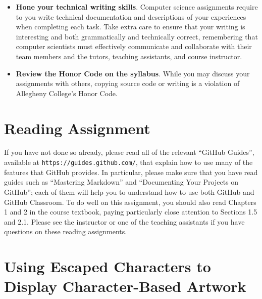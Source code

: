 \documentclass[11pt]{article}
\newcommand{\url}[1]{\lstinline{#1}}
\begin{document}
\begin{itemize}
\item {\bf Hone your technical writing skills}. Computer science assignments
  require to you write technical documentation and descriptions of your
  experiences when completing each task. Take extra care to ensure that your
  writing is interesting and both grammatically and technically correct,
  remembering that computer scientists must effectively communicate and
  collaborate with their team members and the tutors, teaching assistants, and
  course instructor.

\item {\bf Review the Honor Code on the syllabus}. While you may discuss your
  assignments with others, copying source code or writing is a violation of
  Allegheny College's Honor Code.

\end{itemize}

\section*{Reading Assignment}

If you have not done so already, please read all of the relevant ``GitHub
Guides'', available at \url{https://guides.github.com/}, that explain how to
use many of the features that GitHub provides. In particular, please make sure
that you have read guides such as ``Mastering Markdown'' and ``Documenting Your
Projects on GitHub''; each of them will help you to understand how to use both
GitHub and GitHub Classroom. To do well on this assignment, you should also
read Chapters 1 and 2 in the course textbook, paying particularly close
attention to Sections 1.5 and 2.1. Please see the instructor or one of the
teaching assistants if you have questions on these reading assignments.

\section*{Using Escaped Characters to Display Character-Based Artwork}
\end{document}
